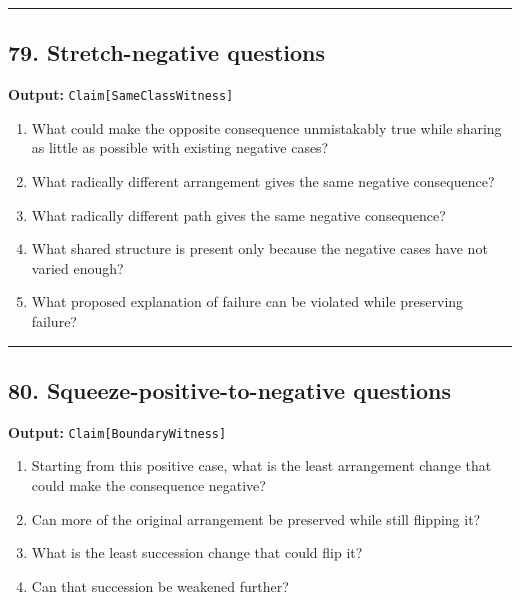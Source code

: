 \documentclass[
]{article}
\providecommand{\tightlist}{%
  \setlength{\itemsep}{0pt}\setlength{\parskip}{0pt}}
\begin{document}
\begin{center}\rule{0.5\linewidth}{0.5pt}\end{center}

\subsection{79. Stretch-negative
questions}\label{stretch-negative-questions}

\textbf{Output:} \texttt{Claim{[}SameClassWitness{]}}

\begin{enumerate}
\def\labelenumi{\arabic{enumi}.}
\tightlist
\item
  What could make the opposite consequence unmistakably true while
  sharing as little as possible with existing negative cases?
\item
  What radically different arrangement gives the same negative
  consequence?
\item
  What radically different path gives the same negative consequence?
\item
  What shared structure is present only because the negative cases have
  not varied enough?
\item
  What proposed explanation of failure can be violated while preserving
  failure?
\end{enumerate}

\begin{center}\rule{0.5\linewidth}{0.5pt}\end{center}

\subsection{80. Squeeze-positive-to-negative
questions}\label{squeeze-positive-to-negative-questions}

\textbf{Output:} \texttt{Claim{[}BoundaryWitness{]}}

\begin{enumerate}
\def\labelenumi{\arabic{enumi}.}
\tightlist
\item
  Starting from this positive case, what is the least arrangement change
  that could make the consequence negative?
\item
  Can more of the original arrangement be preserved while still flipping
  it?
\item
  What is the least succession change that could flip it?
\item
  Can that succession be weakened further?
\end{enumerate}
\end{document}
